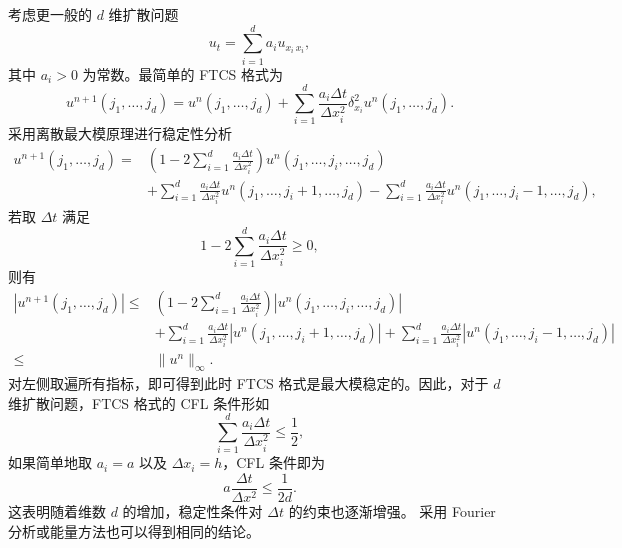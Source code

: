 考虑更一般的 $d$ 维扩散问题
\[
    u_t = \sum_{i=1}^d a_i u_{x_i\,x_i},
\]
其中 $a_i > 0$ 为常数。最简单的 FTCS 格式为
\[
    u^{n+1}(j_1,\dots,j_d) = u^n(j_1,\dots,j_d) + \sum_{i=1}^d \frac{a_i \Delta t}{\Delta x_i^2} \delta^2_{x_i} u^n(j_1,\dots,j_d).
\]
采用离散最大模原理进行稳定性分析
\begin{align*}
    u^{n+1}(j_1,\dots,j_d) ={} & \left(1 - 2 \sum_{i=1}^d \frac{a_i \Delta t}{\Delta x_i^2} \right) u^n(j_1,\dots, j_i,\dots,j_d)
    \\
                               & + \sum_{i=1}^d \frac{a_i \Delta t}{\Delta x_i^2} u^n(j_1,\dots, j_i + 1,\dots,j_d) - \sum_{i=1}^d \frac{a_i \Delta t}{\Delta x_i^2} u^n(j_1,\dots, j_i - 1,\dots,j_d),
\end{align*}
若取 $\Delta t$ 满足
\[
    1 - 2 \sum_{i=1}^d \frac{a_i \Delta t}{\Delta x_i^2} \ge 0,
\]
则有
\begin{align*}
    |u^{n+1}(j_1,\dots,j_d)| \le{} & \left(1 - 2 \sum_{i=1}^d \frac{a_i \Delta t}{\Delta x_i^2} \right) |u^n(j_1,\dots, j_i,\dots,j_d)|
    \\
                                   & + \sum_{i=1}^d \frac{a_i \Delta t}{\Delta x_i^2} |u^n(j_1,\dots, j_i + 1,\dots,j_d)|
    + \sum_{i=1}^d \frac{a_i \Delta t}{\Delta x_i^2} |u^n(j_1,\dots, j_i - 1,\dots,j_d)|
    \\
    \le{}                          & \|u^n\|_{\infty}.
\end{align*}
对左侧取遍所有指标，即可得到此时 FTCS 格式是最大模稳定的。因此，对于 $d$ 维扩散问题，FTCS 格式的 CFL 条件形如
\[
\sum_{i=1}^d \frac{a_i \Delta t}{\Delta x_i^2} \le \frac12,
\]
如果简单地取 $a_i = a$ 以及 $\Delta x_i = h$，CFL 条件即为
\[
a \frac{\Delta t}{\Delta x^2} \le \frac{1}{2d}.
\]
这表明随着维数 $d$ 的增加，稳定性条件对 $\Delta t$ 的约束也逐渐增强。
采用 Fourier 分析或能量方法也可以得到相同的结论。
